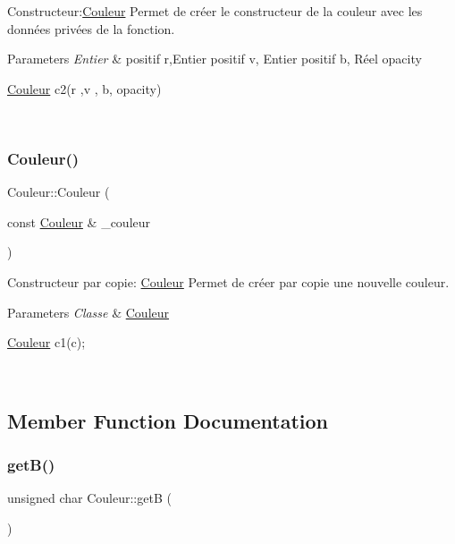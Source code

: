Constructeur\+:\hyperlink{classCouleur}{Couleur} Permet de créer le constructeur de la couleur avec les données privées de la fonction. 


\begin{DoxyParams}{Parameters}
{\em Entier} & positif r,Entier positif v, Entier positif b, Réel opacity 
\begin{DoxyCode}
\hyperlink{classCouleur}{Couleur} c2(r ,v , b, opacity)
\end{DoxyCode}
 \\
\hline
\end{DoxyParams}
\mbox{\label{classCouleur_a393a7c4193f593f083d7a25dba062cc5}} 
\subsubsection{\texorpdfstring{Couleur()}{Couleur()}\hspace{0.1cm}{\footnotesize\ttfamily [3/3]}}
{\footnotesize\ttfamily Couleur\+::\+Couleur (\begin{DoxyParamCaption}\item[{const \hyperlink{classCouleur}{Couleur} \&}]{\+\_\+couleur }\end{DoxyParamCaption})}



Constructeur par copie\+: \hyperlink{classCouleur}{Couleur} Permet de créer par copie une nouvelle couleur. 


\begin{DoxyParams}{Parameters}
{\em Classe} & \hyperlink{classCouleur}{Couleur} 
\begin{DoxyCode}
\hyperlink{classCouleur}{Couleur} c1(c);
\end{DoxyCode}
 \\
\hline
\end{DoxyParams}


\subsection{Member Function Documentation}
\mbox{\label{classCouleur_aab24066e81089a96d15bcb04aa2c77df}} 
\subsubsection{\texorpdfstring{get\+B()}{getB()}}
{\footnotesize\ttfamily unsigned char Couleur\+::getB (\begin{DoxyParamCaption}{ }\end{DoxyParamCaption})}



